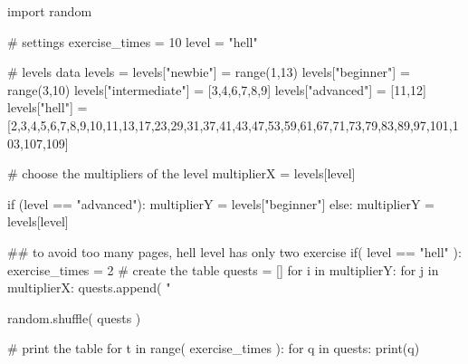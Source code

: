 \documentclass{article}
\begin{document}
\begin{multicols}{6}

\large
{}
\noindent 
\begin{pycode}
import random

# settings 
exercise_times = 10
level = "hell"

# levels data
levels = {}
levels["newbie"]   = range(1,13)
levels["beginner"] = range(3,10)
levels["intermediate"] = [3,4,6,7,8,9]
levels["advanced"]     = [11,12]
levels["hell"] = [2,3,4,5,6,7,8,9,10,11,13,17,23,29,31,37,41,43,47,53,59,61,67,71,73,79,83,89,97,101,103,107,109]

# choose the multipliers of the level
multiplierX = levels[level]

if (level == "advanced"):
    multiplierY = levels["beginner"]
else:
    multiplierY = levels[level]

## to avoid too many pages, hell level has only two exercise
if( level == "hell" ):
    exercise_times = 2  
# create the table
quests = []
for i in multiplierY:
    for j in multiplierX:
        quests.append( "%

random.shuffle( quests )

# print the table
for t in range( exercise_times ):
    for q in quests:
        print(q)

\end{pycode}
\end{multicols}
\end{document}
